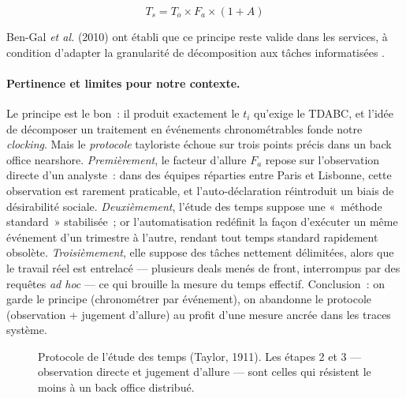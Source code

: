 \begin{equation}
T_s = T_o \times F_a \times (1 + A)
\label{eq:temps-standard}
\end{equation}

Ben-Gal \textit{et al.} (2010) ont établi que ce principe reste valide dans les
services, à condition d'adapter la granularité de décomposition aux tâches informatisées
\cite{bengal2010}.

\paragraph{Pertinence et limites pour notre contexte.}
Le principe est le bon~: il produit exactement le $t_i$ qu'exige le TDABC, et l'idée de
décomposer un traitement en événements chronométrables fonde notre \textit{clocking}.
Mais le \emph{protocole} tayloriste échoue sur trois points précis dans un back office
nearshore. \emph{Premièrement}, le facteur d'allure $F_a$ repose sur l'observation
directe d'un analyste~: dans des équipes réparties entre Paris et Lisbonne, cette
observation est rarement praticable, et l'auto-déclaration réintroduit un biais de
désirabilité sociale. \emph{Deuxièmement}, l'étude des temps suppose une «~méthode
standard~» stabilisée~; or l'automatisation redéfinit la façon d'exécuter un même
événement d'un trimestre à l'autre, rendant tout temps standard rapidement obsolète.
\emph{Troisièmement}, elle suppose des tâches nettement délimitées, alors que le travail
réel est entrelacé --- plusieurs deals menés de front, interrompus par des requêtes
\textit{ad hoc} --- ce qui brouille la mesure du temps effectif. Conclusion~: on garde le
principe (chronométrer par événement), on abandonne le protocole (observation +
jugement d'allure) au profit d'une mesure ancrée dans les traces système.

\begin{figure}[htbp]\centering
{}
\caption{Protocole de l'étude des temps (Taylor, 1911). Les étapes 2 et 3 — observation directe et jugement d'allure — sont celles qui résistent le moins à un back office distribué.}
\label{fig:taylor}\end{figure}



